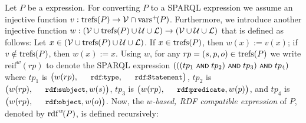 Let $P$ be a {\SPARQLplus} expression.
	For converting $P$ to a SPARQL expression we
assume an  injective function $v : \mathrm{trefs}(P) \rightarrow \mathcal{V} \cap \mathrm{vars}^+\!(P)$. Furthermore, we introduce another injective function $w : (\mathcal{V} \cup \mathrm{trefs}(P) \cup \mathcal{U} \cup \mathcal{L}) \rightarrow (\mathcal{V} \cup \mathcal{U} \cup \mathcal{L})$ that is defined as follows: Let $x \in (\mathcal{V} \cup \mathrm{trefs}(P) \cup \mathcal{U} \cup \mathcal{L})$. If $x \in \mathrm{trefs}(P)$, then $w(x) := v(x)$; if $v \notin \mathrm{trefs}(P)$, then $w(x) := x$.
%
Using $w$, for any $rp = (s,p,o) \in \mathrm{trefs}(P)$ we write $\mathrm{reif}^w\!( rp )$ to denote
	the SPARQL expression $( ( ( tp_1 \text{ \normalfont\scriptsize\textsf{AND} } tp_2 ) \text{ \normalfont\scriptsize\textsf{AND} } tp_3 ) \text{ \normalfont\scriptsize\textsf{AND} } tp_4 )$ where $tp_1$ is $\bigl(w(rp),\mathTinyRDF{rdf\!:\!type},\mathTinyRDF{rdf\!:\!Statement}\bigr)$, $tp_2$ is $\bigl(w(rp),\mathTinyRDF{rdf\!:\!subject},w(s)\bigr)$, $tp_3$ is $\bigl(w(rp),\mathTinyRDF{rdf\!:\!predicate},w(p)\bigr)$, and $tp_4$ is $\bigl(w(rp),\mathTinyRDF{rdf\!:\!object},w(o)\bigr)$.
%
Now, the \emph{$w$-based, RDF compatible expression} of $P$, denoted by $\mathrm{rdf}^{w}\!(P)$, is defined recursively: %
